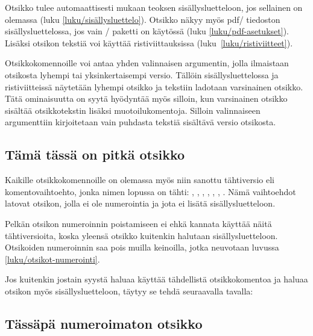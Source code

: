 \noindent
Otsikko tulee automaattisesti mukaan teoksen sisällysluetteloon, jos
sellainen on olemassa (luku \ref{luku/sisällysluettelo}). Otsikko näkyy
myös pdf\-/ tiedoston sisällysluettelossa, jos vain
\-/ paketti on käytössä (luku
\ref{luku/pdf-asetukset}). Lisäksi otsikon tekstiä voi käyttää
ristiviittauksissa (luku~\ref{luku/ristiviitteet}).

Otsikkokomennoille voi antaa yhden valinnaisen argumentin, jolla
ilmaistaan otsikosta lyhempi tai yksinkertaisempi versio. Tällöin
sisällysluettelossa ja ristiviitteissä näytetään lyhempi otsikko ja
tekstiin ladotaan varsinainen otsikko. Tätä ominaisuutta on syytä
hyödyntää myös silloin, kun varsinainen otsikko sisältää otsikkotekstin
lisäksi muotoilukomentoja. Silloin valinnaiseen argumenttiin
kirjoitetaan vain puhdasta tekstiä sisältävä versio otsikosta.

\begin{koodilohkosis}
\section[Lyhyt otsikko]{Tämä tässä on pitkä otsikko}
\end{koodilohkosis}

\noindent
Kaikille otsikkokomennoille on olemassa myös niin sanottu tähtiversio
eli komentovaihtoehto, jonka nimen lopussa on tähti: ,
, , ,
, , .
Nämä vaihtoehdot latovat otsikon, jolla ei ole numerointia ja jota ei
lisätä sisällysluetteloon.

Pelkän otsikon numeroinnin poistamiseen ei ehkä kannata käyttää näitä
tähtiversioita, koska yleensä otsikko kuitenkin halutaan
sisällysluetteloon. Otsikoiden numeroinnin saa pois muilla keinoilla,
jotka neuvotaan luvussa \ref{luku/otsikot-numerointi}.

Jos kuitenkin jostain syystä haluaa käyttää tähdellistä otsikkokomentoa
ja haluaa otsikon myös sisällysluetteloon, täytyy se tehdä seuraavalla
tavalla:

\begin{koodilohkosis}
\section*{Tässäpä numeroimaton otsikko}
{}
\end{koodilohkosis}

